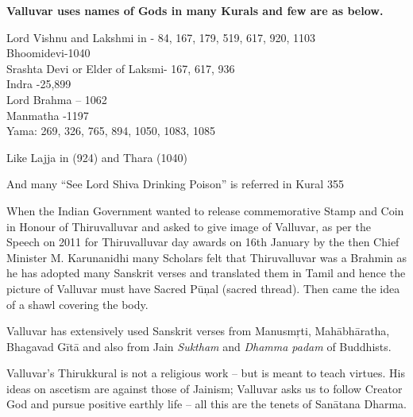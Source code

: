 \textbf{Valluvar uses names of Gods in many Kurals and few are as below.}

Lord Vishnu and Lakshmi in - 84, 167, 179, 519, 617, 920, 1103\\ Bhoomidevi-1040\\ Srashta Devi or Elder of Laksmi- 167, 617, 936\\ Indra -25,899\\ Lord Brahma – 1062\\ Manmatha -1197\\ Yama: 269, 326, 765, 894, 1050, 1083, 1085

Like Lajja in  (924) and Thara  (1040)

And many “See Lord Shiva Drinking Poison” is referred in Kural 355

When the Indian Government wanted to release commemorative Stamp and Coin in Honour of Thiruvalluvar and asked to give image of Valluvar, as per the Speech on 2011 for Thiruvalluvar day awards on 16th January by the then Chief Minister M. Karunanidhi many Scholars felt that Thiruvalluvar was a Brahmin as he has adopted many Sanskrit verses and translated them in Tamil and hence the picture of Valluvar must have Sacred Pūņal (sacred thread). Then came the idea of a shawl covering the body.

Valluvar has extensively used Sanskrit verses from Manusmŗti, Mahābhāratha, Bhagavad Gītā and also from Jain \textit{Suktham} and \textit{Dhamma padam} of Buddhists.

Valluvar’s Thirukkural is not a religious work – but is meant to teach virtues. His ideas on ascetism are against those of Jainism; Valluvar asks us to follow Creator God and pursue positive earthly life -- all this are the tenets of Sanātana Dharma.

\newpage

\theendnotes

